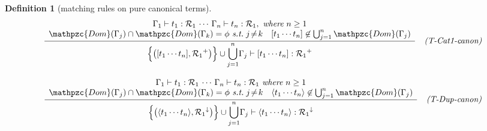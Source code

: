 \documentclass[12pt]{article}
\newtheorem{Definition}{Definition}[section]
\begin{document}
\begin{Definition}[matching rules on pure canonical terms]
\begin{displaymath}
\begin{array}{c}
      \begin{array}{rl}
        \dfrac{
          \begin{array}{c}
            \Gamma_1 \vdash t_1 : \mathcal{R}_1 \,\cdots\,
             \Gamma_n \vdash t_n : \mathcal{R}_1,\
              \text{\it where}\ n \ge 1 \\
            \mathpzc{Dom}(\Gamma_j) \cap \mathpzc{Dom}(\Gamma_k) = \phi
             \ \text{\it s.t.}\; j \!\neq\! k
            \quad [t_1 \cdots t_n ] \not\in \bigcup_{j=1}^{n}
             \mathpzc{Dom}(\Gamma_j)
          \end{array}
        }{
          \Bigl\{\bigl([t_1 \cdots t_n], {\mathcal{R}_1}^+ \bigr) \Bigr\}
           \cup {\displaystyle \bigcup_{j = 1}^{n}} \Gamma_j
            \vdash [t_1 \cdots t_n] : {\mathcal{R}_1}^+
        }  &  \text{\it (T-Cat1-canon)}
      \end{array}  \\
      \\
      
      \begin{array}{rl}
        \dfrac{
          \begin{array}{c}
            \Gamma_1 \vdash t_1 : \mathcal{R}_1 \,\cdots\,
             \Gamma_n \vdash t_n : \mathcal{R}_1\
              \text{\it where}\ n \ge 1 \\
            \mathpzc{Dom}(\Gamma_j) \cap \mathpzc{Dom}(\Gamma_k) = \phi
             \ \text{\it s.t.}\; j \!\neq\! k
            \quad \langle t_1 \cdots t_n \rangle \not\in \bigcup_{j=1}^{n}
             \mathpzc{Dom}(\Gamma_j)
          \end{array}
        }{
          \Bigl\{\bigl(\langle t_1 \cdots t_n \rangle,
          {\mathcal{R}_1}^\downarrow \bigr) \Bigr\}
          \cup {\displaystyle \bigcup_{j = 1}^{n}} \Gamma_j \vdash
          \langle t_1 \cdots t_n \rangle : {\mathcal{R}_1}^\downarrow
        }  &  \text{\it (T-Dup-canon)}
      \end{array}  \\
      
    \end{array}
  \end{displaymath}
  
  \begin{displaymath}
    \begin{array}{c}
      

\end{array}
\end{displaymath}
\end{Definition}
\end{document}

